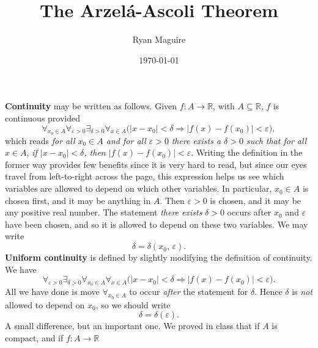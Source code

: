 \documentclass{article}
\title{The Arzel\'{a}-Ascoli Theorem}
\author{Ryan Maguire}
\date{\today}
\theoremstyle{normal}
\begin{document}
    \maketitle
    \textbf{Continuity} may be written as follows.
    Given $f:A\rightarrow\mathbb{R}$, with $A\subseteq\mathbb{R}$,
    $f$ is continuous provided
    \begin{equation}
        \forall_{x_{0}\in{A}}
        \forall_{\varepsilon>0}
        \exists_{\delta>0}
        \forall_{x\in{A}}
        \Big(
            |x-x_{0}|<\delta
            \Rightarrow
            |f(x)-f(x_{0})|<\varepsilon
        \Big),
    \end{equation}
    which reads
    \textit{for all $x_{0}\in{A}$ and for all $\varepsilon>0$}
    \textit{there exists a $\delta>0$ such that for all $x\in{A}$},
    \textit{if $|x-x_{0}|<\delta$, then $|f(x)-f(x_{0})|<\varepsilon$}.
    Writing the definition in the former way provides few benefits since it is
    very hard to read, but since our eyes travel from left-to-right across
    the page, this expression helps us see which variables are allowed to
    depend on which other variables. In particular, $x_{0}\in{A}$ is chosen
    first, and it may be anything in $A$. Then $\varepsilon>0$ is chosen, and
    it may be any positive real number. The statement \textit{there exists}
    $\delta>0$ occurs after $x_{0}$ and $\varepsilon$ have been chosen, and so
    it is allowed to depend on these two variables. We may write
    \begin{equation}
        \delta
        =
        \delta(x_{0},\,\varepsilon).
    \end{equation}
    \textbf{Uniform continuity} is defined by slightly modifying the
    definition of continuity. We have
    \begin{equation}
        \forall_{\varepsilon>0}
        \exists_{\delta>0}
        \forall_{x_{0}\in{A}}
        \forall_{x\in{A}}
        \Big(
            |x-x_{0}|<\delta
            \Rightarrow
            |f(x)-f(x_{0})|<\varepsilon
        \Big).
    \end{equation}
    All we have done is move $\forall_{x_{0}\in{A}}$ to occur \textit{after}
    the statement for $\delta$. Hence $\delta$ is \textit{not} allowed to
    depend on $x_{0}$, so we should write
    \begin{equation}
        \delta
        =
        \delta(\varepsilon).
    \end{equation}
    A small difference, but an important one.
    We proved in class that if $A$ is compact, and if $f:A\rightarrow\mathbb{R}$
\end{document}
